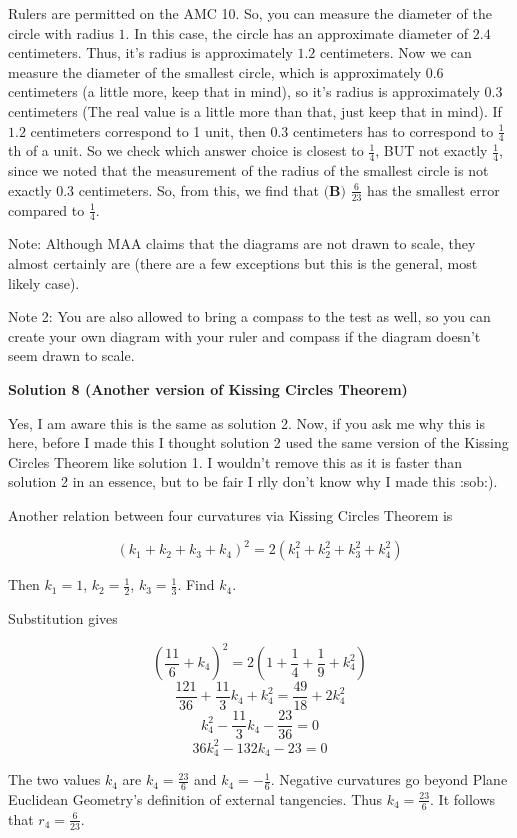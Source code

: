 \begin{enumerate}
 
Rulers are permitted on the AMC 10. So, you can measure the diameter of the circle with radius $1$. In this case, the circle has an approximate diameter of $2.4$ centimeters. Thus, it's radius is approximately $1.2$ centimeters. Now we can measure the diameter of the smallest circle, which is approximately $0.6$ centimeters (a little more, keep that in mind), so it's radius is approximately $0.3$ centimeters (The real value is a little more than that, just keep that in mind). If $1.2$ centimeters correspond to 1 unit, then $0.3$ centimeters has to correspond to $\frac{1}{4}$th of a unit. So we check which answer choice is closest to $\frac{1}{4}$, BUT not exactly $\frac{1}{4}$, since we noted that the measurement of the radius of the smallest circle is not exactly $0.3$ centimeters. So, from this, we find that $\boxed{\textbf{(B) }\frac{6}{23}}$ has the smallest error compared to $\frac{1}{4}$.

 
Note: Although MAA claims that the diagrams are not drawn to scale, they almost certainly are (there are a few exceptions but this is the general, most likely case).

 Note 2: You are also allowed to bring a compass to the test as well, so you can create your own diagram with your ruler and compass if the diagram doesn't seem drawn to scale.

 



\textbf{Solution 8 (Another version of Kissing Circles Theorem)}

Yes, I am aware this is the same as solution 2. Now, if you ask me why this is here, before I made this I thought solution 2 used the same version of the Kissing Circles Theorem like solution 1. I wouldn't remove this as it is faster than solution 2 in an essence, but to be fair I rlly don't know why I made this :sob:).

 Another relation between four curvatures via Kissing Circles Theorem is

 
 \[(k_1 + k_2 + k_3 + k_4)^2 = 2(k_1^2 + k_2^2 +k_3^2 + k_4^2)\]

 Then $k_1 = 1$, $k_2 = \frac{1}{2}$, $k_3 = \frac{1}{3}$. Find $k_4$.

 Substitution gives

 
 \[(\frac{11}{6} + k_4)^2 = 2(1+\frac{1}{4} + \frac{1}{9} + k_4^2)\]
 \[\frac{121}{36} + \frac{11}{3}k_4 + k_4^2 = \frac{49}{18} + 2k_4^2\]
 \[k_4^2 - \frac{11}{3}k_4 -\frac{23}{36} = 0\]
 \[36k_4^2 -132k_4 - 23 = 0\]

 The two values $k_4$ are $k_4 = \frac{23}{6}$ and $k_4 = -\frac{1}{6}$. Negative curvatures go beyond Plane Euclidean Geometry's definition of external tangencies. Thus $k_4 = \frac{23}{6}$. It follows that $r_4 = \boxed{\frac{6}{23}}$.


\end{enumerate}
